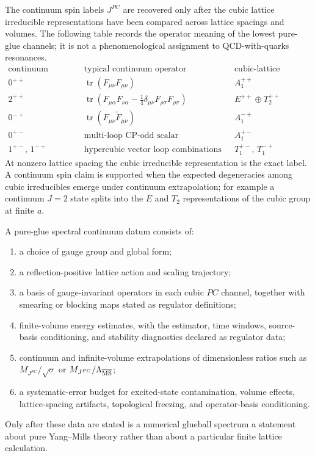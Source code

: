 The continuum spin labels \(J^{PC}\) are recovered only after the cubic
lattice irreducible representations have been compared across lattice
spacings and volumes.  The following table records the operator meaning of the
lowest pure-glue channels; it is not a phenomenological assignment to
QCD-with-quarks resonances.
\[
\begin{array}{c|c|c}
\text{continuum channel} & \text{typical continuum operator} &
\text{cubic-lattice channel} \\
\hline
0^{++} &
\operatorname{tr}(F_{\mu\nu}F_{\mu\nu}) &
A_1^{++} \\
2^{++} &
\operatorname{tr}\!\left(F_{\mu\alpha}F_{\nu\alpha}
-\frac14\delta_{\mu\nu}F_{\rho\sigma}F_{\rho\sigma}\right) &
E^{++}\oplus T_2^{++} \\
0^{-+} &
\operatorname{tr}(F_{\mu\nu}\widetilde F_{\mu\nu}) &
A_1^{-+} \\
0^{+-} &
\text{multi-loop CP-odd scalar combinations} &
A_1^{+-} \\
1^{+-},\,1^{-+} &
\text{hypercubic vector loop combinations} &
T_1^{+-},\,T_1^{-+}
\end{array}
\]
At nonzero lattice spacing the cubic irreducible representation is the exact
label.  A continuum spin claim is supported when the expected degeneracies
among cubic irreducibles emerge under continuum extrapolation; for example a
continuum \(J=2\) state splits into the \(E\) and \(T_2\) representations of
the cubic group at finite \(a\).

\begin{definition}
\label{def:pure-glue-spectral-continuum-datum}
A pure-glue spectral continuum datum consists of:
\begin{enumerate}
  \item a choice of gauge group and global form;
  \item a reflection-positive lattice action and scaling trajectory;
  \item a basis of gauge-invariant operators in each cubic \(PC\) channel,
  together with smearing or blocking maps stated as regulator definitions;
  \item finite-volume energy estimates, with the estimator, time windows,
  source-basis conditioning, and stability diagnostics declared as regulator
  data;
  \item continuum and infinite-volume extrapolations of dimensionless ratios
  such as \(M_{J^{PC}}/\sqrt\sigma\) or \(M_{J^{PC}}/\Lambda_{\overline{\rm MS}}\);
  \item a systematic-error budget for excited-state contamination, volume
  effects, lattice-spacing artifacts, topological freezing, and operator-basis
  conditioning.
\end{enumerate}
Only after these data are stated is a numerical glueball spectrum a statement
about pure Yang--Mills theory rather than about a particular finite lattice
calculation.
\end{definition}

